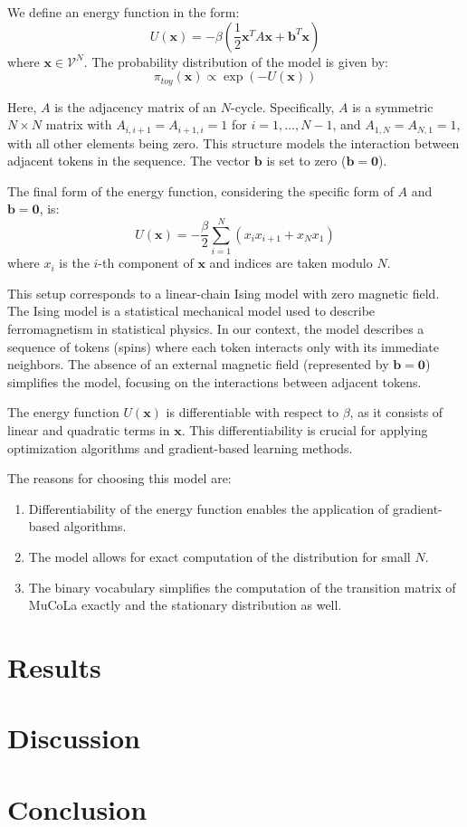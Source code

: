 \documentclass{article}
\begin{document}
We define an energy function in the form:
\[ U(\boldsymbol{x}) = - \beta \left(\frac{1}{2}\boldsymbol{x}^T A \boldsymbol{x} + \boldsymbol{b}^T \boldsymbol{x}\right) \]
where \(\boldsymbol{x} \in \mathcal{V}^N\). The probability distribution of the model is given by:
\[ \pi_{toy}(\boldsymbol{x}) \propto \exp(-U(\boldsymbol{x})) \]

Here, \(A\) is the adjacency matrix of an \(N\)-cycle. Specifically, \(A\) is a symmetric \(N \times N\) matrix with \(A_{i,i+1} = A_{i+1,i} = 1\) for \(i = 1, \ldots, N-1\), and \(A_{1,N} = A_{N,1} = 1\), with all other elements being zero. This structure models the interaction between adjacent tokens in the sequence. The vector \(\boldsymbol{b}\) is set to zero (\(\boldsymbol{b} = \boldsymbol{0}\)).

The final form of the energy function, considering the specific form of \(A\) and \(\boldsymbol{b} = \boldsymbol{0}\), is:
\[ U(\boldsymbol{x}) = - \frac{\beta}{2} \sum_{i=1}^{N} (x_i x_{i+1} + x_{N} x_{1}) \]
where \(x_i\) is the \(i\)-th component of \(\boldsymbol{x}\) and indices are taken modulo \(N\).

This setup corresponds to a linear-chain Ising model with zero magnetic field. The Ising model is a statistical mechanical model used to describe ferromagnetism in statistical physics. In our context, the model describes a sequence of tokens (spins) where each token interacts only with its immediate neighbors. The absence of an external magnetic field (represented by \(\boldsymbol{b} = \boldsymbol{0}\)) simplifies the model, focusing on the interactions between adjacent tokens.

The energy function \(U(\boldsymbol{x})\) is differentiable with respect to \(\beta\), as it consists of linear and quadratic terms in \(\boldsymbol{x}\). This differentiability is crucial for applying optimization algorithms and gradient-based learning methods.

The reasons for choosing this model are:
\begin{enumerate}
    \item Differentiability of the energy function enables the application of gradient-based algorithms.
    \item The model allows for exact computation of the distribution for small \(N\).
    \item The binary vocabulary simplifies the computation of the transition matrix of MuCoLa exactly and the stationary distribution as well.
\end{enumerate}

\section{Results}


\section{Discussion}


\section{Conclusion}





\end{document}
